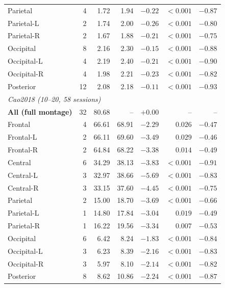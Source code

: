 \begin{table}[htbp]
\begin{tabular}{lrrrrrr}
Parietal & 4 & 1.72 & 1.94 & $-0.22$ & $<0.001$ & $-0.87$ \\
Parietal-L & 2 & 1.74 & 2.00 & $-0.26$ & $<0.001$ & $-0.80$ \\
Parietal-R & 2 & 1.67 & 1.88 & $-0.21$ & $<0.001$ & $-0.75$ \\
Occipital & 8 & 2.16 & 2.30 & $-0.15$ & $<0.001$ & $-0.88$ \\
Occipital-L & 4 & 2.19 & 2.40 & $-0.21$ & $<0.001$ & $-0.90$ \\
Occipital-R & 4 & 1.98 & 2.21 & $-0.23$ & $<0.001$ & $-0.82$ \\
Posterior & 12 & 2.08 & 2.18 & $-0.11$ & $<0.001$ & $-0.93$ \\
\midrule
\multicolumn{7}{l}{\textit{Cao2018 (10--20, 58 sessions)}} \\[2pt]
\textbf{All (full montage)} & 32 & 80.68 & -- & $+0.00$ & -- & -- \\
Frontal & 4 & 66.61 & 68.91 & $-2.29$ & $0.026$ & $-0.47$ \\
Frontal-L & 2 & 66.11 & 69.60 & $-3.49$ & $0.029$ & $-0.46$ \\
Frontal-R & 2 & 64.84 & 68.22 & $-3.38$ & $0.014$ & $-0.49$ \\
Central & 6 & 34.29 & 38.13 & $-3.83$ & $<0.001$ & $-0.91$ \\
Central-L & 3 & 32.97 & 38.66 & $-5.69$ & $<0.001$ & $-0.83$ \\
Central-R & 3 & 33.15 & 37.60 & $-4.45$ & $<0.001$ & $-0.75$ \\
Parietal & 2 & 15.00 & 18.70 & $-3.69$ & $<0.001$ & $-0.66$ \\
Parietal-L & 1 & 14.80 & 17.84 & $-3.04$ & $0.019$ & $-0.49$ \\
Parietal-R & 1 & 16.22 & 19.56 & $-3.34$ & $0.007$ & $-0.53$ \\
Occipital & 6 & 6.42 & 8.24 & $-1.83$ & $<0.001$ & $-0.84$ \\
Occipital-L & 3 & 6.23 & 8.39 & $-2.16$ & $<0.001$ & $-0.83$ \\
Occipital-R & 3 & 5.97 & 8.10 & $-2.14$ & $<0.001$ & $-0.82$ \\
Posterior & 8 & 8.62 & 10.86 & $-2.24$ & $<0.001$ & $-0.87$ \\
\bottomrule
\end{tabular}
\end{table}
